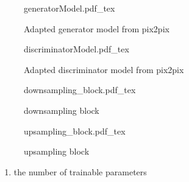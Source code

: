 \begin{figure}[p]
    \tiny
    {generatorModel.pdf_tex}
    \caption{Adapted generator model from pix2pix} \label{fig:methods:GAN_arch:generator}
\end{figure}
\begin{figure}[p]
    \scriptsize
    \centering
    {discriminatorModel.pdf_tex}
    \caption{Adapted discriminator model from pix2pix} \label{fig:methods:GAN_arch:discriminator}
\end{figure}
\begin{figure}[p]
    \scriptsize
    \centering
    {downsampling_block.pdf_tex}
    \caption{downsampling block} \label{fig:methods:GAN_arch:downsampling}
\end{figure}
\begin{figure}[p]
    \scriptsize
    \centering
    {upsampling_block.pdf_tex}
    \caption{upsampling block} \label{fig:methods:GAN_arch:upsampling}
\end{figure}


\begin{enumerate}
 \item the number of trainable parameters
\end{enumerate}

